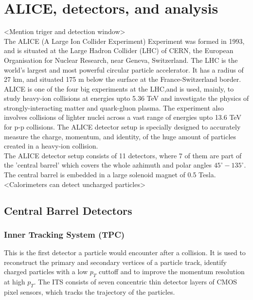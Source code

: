 \documentclass[12pt,a4paper,twoside]{report}
\begin{document}
\section{ALICE, detectors, and analysis}<Mention triger and detection window>\\
The ALICE (A Large Ion Collider Experiment) Experiment was formed in 1993, and is situated at the Large Hadron Collider (LHC) of CERN, the European Organisation for Nuclear Research, near Geneva, Switzerland. The LHC is the world's largest and most powerful circular particle accelerator. It has a radius of 27 km, and situated 175 m below the surface at the France-Switzerland border.\\
ALICE is one of the four big experiments at the LHC,and is used, mainly, to study heavy-ion collisions at energies upto 5.36 TeV and investigate the physics of strongly-interacting matter and quark-gluon plasma. The experiment also involves collisions of lighter nuclei across a vast range of energies upto 13.6 TeV for p-p collisions. The ALICE detector setup is specially designed to accurately measure the charge, momentum, and identity, of the huge amount of particles created in a heavy-ion collision.\\
The ALICE detector setup consists of 11 detectors, where 7 of them are part of the 'central barrel' which covers the whole azhimuth and polar angles $45^\circ-135^\circ$. The central barrel is embedded in a large solenoid magnet of 0.5 Tesla.\\
<Calorimeters can detect uncharged particles>
\subsection{Central Barrel Detectors}
\subsubsection{Inner Tracking System (TPC)}
This is the first detector a particle would encounter after a collision. It is used to reconstruct the primary and secondary vertices of a particle track, identify charged particles with a low $p_T$ cuttoff and to improve the momentum resolution at high $p_T$. The ITS consists of seven concentric thin detector layers of CMOS pixel sensors, which tracks the trajectory of the particles.
\end{document}
